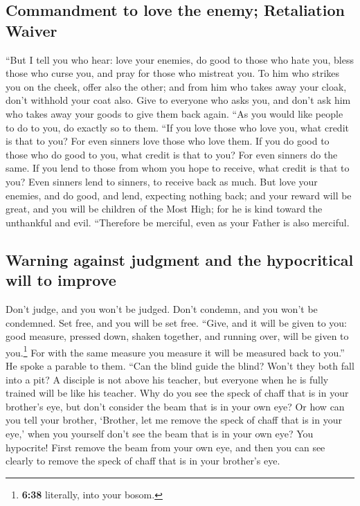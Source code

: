 \hypertarget{commandment-to-love-the-enemy-retaliation-waiver}{%
\subsection{Commandment to love the enemy; Retaliation
Waiver}\label{commandment-to-love-the-enemy-retaliation-waiver}}

 ``But I tell you who hear: love your enemies, do good to
those who hate you,  bless those who curse you, and pray
for those who mistreat you.  To him who strikes you on
the cheek, offer also the other; and from him who takes away your cloak,
don't withhold your coat also.  Give to everyone who asks
you, and don't ask him who takes away your goods to give them back
again.  ``As you would like people to do to you, do
exactly so to them.  ``If you love those who love you,
what credit is that to you? For even sinners love those who love them.
 If you do good to those who do good to you, what credit
is that to you? For even sinners do the same.  If you
lend to those from whom you hope to receive, what credit is that to you?
Even sinners lend to sinners, to receive back as much. 
But love your enemies, and do good, and lend, expecting nothing back;
and your reward will be great, and you will be children of the Most
High; for he is kind toward the unthankful and evil. 
``Therefore be merciful, even as your Father is also merciful.

\hypertarget{warning-against-judgment-and-the-hypocritical-will-to-improve}{%
\subsection{Warning against judgment and the hypocritical will to
improve}\label{warning-against-judgment-and-the-hypocritical-will-to-improve}}

 Don't judge, and you won't be judged. Don't condemn, and
you won't be condemned. Set free, and you will be set free.
 ``Give, and it will be given to you: good measure,
pressed down, shaken together, and running over, will be given to
you.\footnote{\textbf{6:38} literally, into your bosom.} For with the
same measure you measure it will be measured back to you.''
 He spoke a parable to them. ``Can the blind guide the
blind? Won't they both fall into a pit?  A disciple is
not above his teacher, but everyone when he is fully trained will be
like his teacher.  Why do you see the speck of chaff that
is in your brother's eye, but don't consider the beam that is in your
own eye?  Or how can you tell your brother, `Brother, let
me remove the speck of chaff that is in your eye,' when you yourself
don't see the beam that is in your own eye? You hypocrite! First remove
the beam from your own eye, and then you can see clearly to remove the
speck of chaff that is in your brother's eye.

